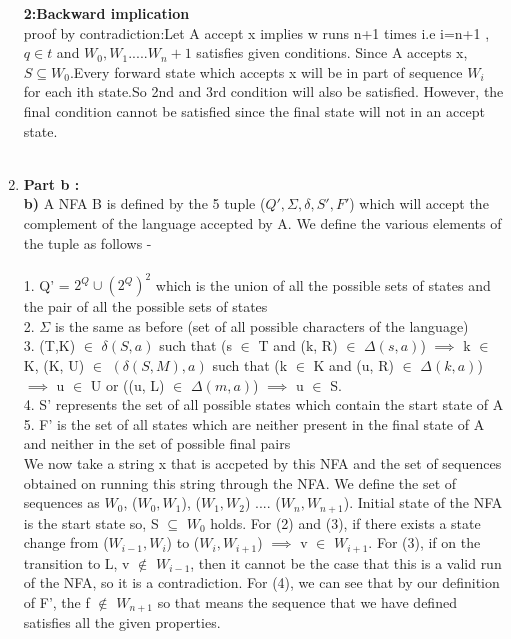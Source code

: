 \documentclass{article}
\begin{document}
\begin{enumerate}
\begin{enumerate}
\end{enumerate}
\textbf{2:Backward implication}\\
proof by contradiction:Let A accept x implies  w runs n+1 times i.e i=n+1 ,$q \in t$ and $W_0,W_1.....W_n+1$ satisfies given conditions. Since A accepts x,$S \subseteq W_0$.Every forward state which accepts x will be in part of sequence $W_i$ for each ith state.So 2nd and 3rd condition will also be satisfied. However, the final condition cannot be satisfied since the final state will not in an accept state.\\\\

\pagebreak
\item \textbf{Part b : }\\
\textbf{b)} A NFA B is defined by the 5 tuple ($Q', \Sigma, \delta, S', F'$) which will accept the complement of the language accepted by A. We define the various elements of the tuple as follows -\\\\
1. Q' = $2^Q \cup (2^Q)^2$ which is the union of all the possible sets of states and the pair of all the possible sets of states \\
2. $\Sigma$ is the same as before (set of all possible characters of the language)\\
3. (T,K) $\in$ $\delta(S, a)$ such that (s $\in$ T and (k, R) $\in$ $\Delta(s, a)$) $\implies$ k $\in$ K, 
(K, U) $\in$ $(\delta(S, M), a)$ such that (k $\in$ K and (u, R) $\in$ $\Delta(k, a)$) $\implies$ u $\in$ U or ((u, L) $\in$ $\Delta(m, a)$) $\implies$ u $\in$ S.\\
4. S' represents the set of all possible states which contain the start state of A\\
5. F' is the set of all states which are neither present in the final state of A and neither in the set of possible final pairs\\

We now take a string x that is accpeted by this NFA and the set of sequences obtained on running this string through the NFA. We define the set of sequences as $W_{0}$, ($W_0, W_1$), ($W_1, W_2$) .... ($W_n, W_{n+1}$). Initial state of the NFA is the start state so, S $\subseteq$ $W_0$ holds. For (2) and (3), if there exists a state change from ($W_{i-1}, W_{i}$) to ($W_{i}, W_{i+1}$)  $\implies$ v $\in$ $W_{i+1}$. For (3), if on the transition to L, v $\notin$ $W_{i-1}$, then it cannot be the case that this is a valid run of the NFA, so it is a contradiction. For (4), we can see that by our definition of F', the f $\notin$ $W_{n+1}$ so that means the sequence that we have defined satisfies all the given properties. 


\end{enumerate}
\end{document}
